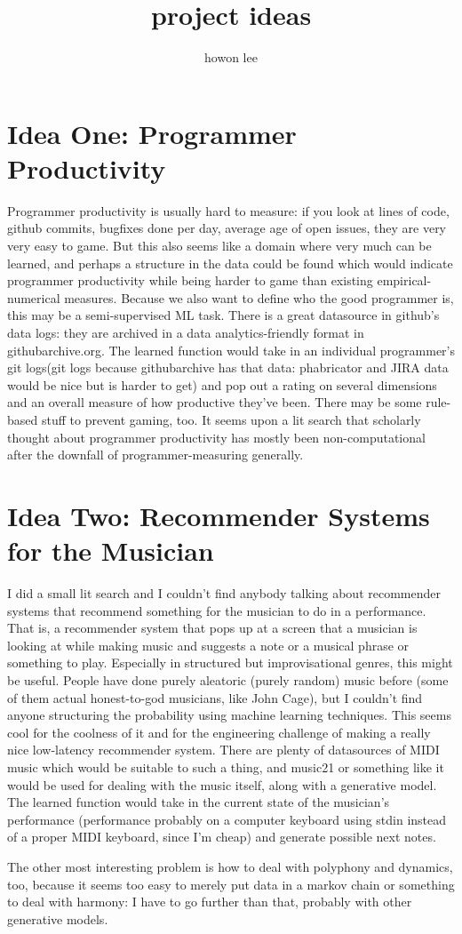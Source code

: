 \documentclass{article}
\begin{document}
\title{project ideas}
\author{howon lee}
\maketitle
\section{Idea One: Programmer Productivity}
Programmer productivity is usually hard to measure: if you look at lines of code, github commits, bugfixes done per day, average age of open issues, they are very very easy to game. But this also seems like a domain where very much can be learned, and perhaps a structure in the data could be found which would indicate programmer productivity while being harder to game than existing empirical-numerical measures. Because we also want to define who the good programmer is, this may be a semi-supervised ML task. There is a great datasource in github's data logs: they are archived in a data analytics-friendly format in githubarchive.org. The learned function would take in an individual programmer's git logs(git logs because githubarchive has that data: phabricator and JIRA data would be nice but is harder to get) and pop out a rating on several dimensions and an overall measure of how productive they've been. There may be some rule-based stuff to prevent gaming, too. It seems upon a lit search that scholarly thought about programmer productivity has mostly been non-computational after the downfall of programmer-measuring generally.

\section{Idea Two: Recommender Systems for the Musician}
I did a small lit search and I couldn't find anybody talking about recommender systems that recommend something for the musician to do in a performance. That is, a recommender system that pops up at a screen that a musician is looking at while making music and suggests a note or a musical phrase or something to play. Especially in structured but improvisational genres, this might be useful. People have done purely aleatoric (purely random) music before (some of them actual honest-to-god musicians, like John Cage), but I couldn't find anyone structuring the probability using machine learning techniques. This seems cool for the coolness of it and for the engineering challenge of making a really nice low-latency recommender system. There are plenty of datasources of MIDI music which would be suitable to such a thing, and music21 or something like it would be used for dealing with the music itself, along with a generative model. The learned function would take in the current state of the musician's performance (performance probably on a computer keyboard using stdin instead of a proper MIDI keyboard, since I'm cheap) and generate possible next notes.

The other most interesting problem is how to deal with polyphony and dynamics, too, because it seems too easy to merely put data in a markov chain or something to deal with harmony: I have to go further than that, probably with other generative models.
\end{document}
